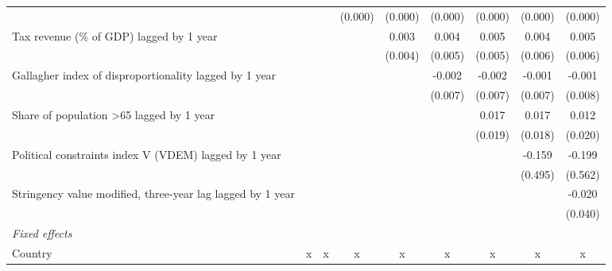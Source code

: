 \begin{tabular}{lcccccccc}
                                                              &              &              & (0.000)      & (0.000)     & (0.000)       & (0.000)       & (0.000)       & (0.000)\\   
   Tax revenue (\% of GDP) lagged by 1 year                   &              &              &              & 0.003       & 0.004         & 0.005         & 0.004         & 0.005\\   
                                                              &              &              &              & (0.004)     & (0.005)       & (0.005)       & (0.006)       & (0.006)\\   
   Gallagher index of disproportionality lagged by 1 year     &              &              &              &             & -0.002        & -0.002        & -0.001        & -0.001\\   
                                                              &              &              &              &             & (0.007)       & (0.007)       & (0.007)       & (0.008)\\   
   Share of population >65 lagged by 1 year                   &              &              &              &             &               & 0.017         & 0.017         & 0.012\\   
                                                              &              &              &              &             &               & (0.019)       & (0.018)       & (0.020)\\   
   Political constraints index V (VDEM) lagged by 1 year      &              &              &              &             &               &               & -0.159        & -0.199\\   
                                                              &              &              &              &             &               &               & (0.495)       & (0.562)\\   
   Stringency value modified, three-year lag lagged by 1 year &              &              &              &             &               &               &               & -0.020\\   
                                                              &              &              &              &             &               &               &               & (0.040)\\   
   \emph{Fixed effects}\\
   Country                                                    & x            & x            & x            & x           & x             & x             & x             & x\\  

\end{tabular}
